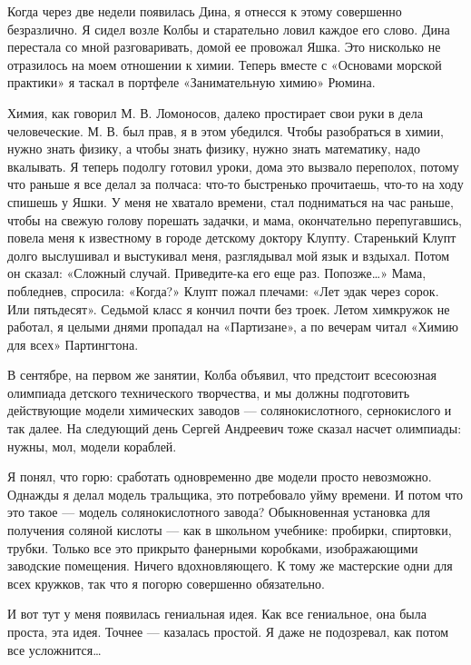 Когда через  две  недели  появилась  Дина, я  отнесся  к  этому  совершенно
безразлично. Я сидел  возле Колбы  и старательно ловил  каждое его  слово.
Дина  перестала  со  мной  разговаривать,  домой  ее  провожал  Яшка.  Это
нисколько не  отразилось  на  моем  отношении к  химии.  Теперь  вместе  с
«Основами морской  практики» я  таскал  в портфеле  «Занимательную  химию»
Рюмина.

Химия, как говорил  М. В. Ломоносов,  далеко простирает свои  руки в  дела
человеческие. М.  В. был  прав, я  в этом  убедился. Чтобы  разобраться  в
химии, нужно знать физику, а  чтобы знать физику, нужно знать  математику,
надо  вкалывать.  Я  теперь  подолгу  готовил  уроки,  дома  это   вызвало
переполох, потому что  раньше я  все делал за  полчаса: что-то  быстренько
прочитаешь, что-то на ходу спишешь у Яшки. У меня не хватало времени, стал
подниматься на  час раньше,  чтобы на  свежую голову  порешать задачки,  и
мама, окончательно  перепугавшись,  повела  меня  к  известному  в  городе
детскому доктору Клупту.  Старенький Клупт долго  выслушивал и  выстукивал
меня, разглядывал мой язык  и вздыхал. Потом  он сказал: «Сложный  случай.
Приведите-ка его еще  раз. Попозже…» Мама,  побледнев, спросила:  «Когда?»
Клупт пожал плечами: «Лет эдак через сорок. Или пятьдесят». Седьмой  класс
я кончил  почти без  троек. Летом  химкружок не  работал, я  целыми  днями
пропадал на «Партизане», а по вечерам читал «Химию для всех» Партингтона.

В сентябре, на первом же занятии, Колба объявил, что предстоит  всесоюзная
олимпиада  детского  технического  творчества,  и  мы  должны  подготовить
действующие модели химических заводов  — солянокислотного, сернокислого  и
так  далее.  На  следующий  день  Сергей  Андреевич  тоже  сказал   насчет
олимпиады: нужны, мол, модели кораблей.

Я понял, что  горю: сработать одновременно  две модели просто  невозможно.
Однажды я делал модель  тральщика, это потребовало  уйму времени. И  потом
что это такое — модель солянокислотного завода? Обыкновенная установка  для
получения соляной кислоты — как в школьном учебнике: пробирки,  спиртовки,
трубки.  Только  все  это  прикрыто  фанерными  коробками,   изображающими
заводские помещения. Ничего вдохновляющего. К тому же мастерские одни  для
всех кружков, так что я погорю совершенно обязательно.

И вот тут у меня появилась  гениальная идея. Как все гениальное, она  была
проста, эта идея.  Точнее — казалась  простой. Я даже  не подозревал,  как
потом все усложнится…

